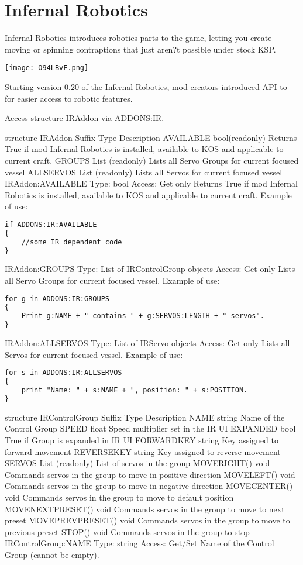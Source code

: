	\section{Infernal Robotics}%
	Infernal Robotics introduces robotics parts to the game, letting you create moving or spinning contraptions that just aren?t possible under stock KSP.
	
\begin{center}
\texttt{[image: O94LBvF.png]}
\end{center}

Starting version 0.20 of the Infernal Robotics, mod creators introduced API to for easier access to robotic features.

Access structure IRAddon via ADDONS:IR.

structure IRAddon
Suffix	Type	Description
AVAILABLE	bool(readonly)	Returns True if mod Infernal Robotics is installed, available to KOS and applicable to current craft.
GROUPS	List (readonly)	Lists all Servo Groups for current focused vessel
ALLSERVOS	List (readonly)	Lists all Servos for current focused vessel
IRAddon:AVAILABLE
Type:	bool
Access:	Get only
Returns True if mod Infernal Robotics is installed, available to KOS and applicable to current craft. Example of use:

\begin{lstlisting}[frame=single,language=XML]
if ADDONS:IR:AVAILABLE
{
    //some IR dependent code
}
\end{lstlisting}

IRAddon:GROUPS
Type:	List of IRControlGroup objects
Access:	Get only
Lists all Servo Groups for current focused vessel. Example of use:

\begin{lstlisting}[frame=single,language=XML]
for g in ADDONS:IR:GROUPS
{
    Print g:NAME + " contains " + g:SERVOS:LENGTH + " servos".
}
\end{lstlisting}

IRAddon:ALLSERVOS
Type:	List of IRServo objects
Access:	Get only
Lists all Servos for current focused vessel. Example of use:

\begin{lstlisting}[frame=single,language=XML]
for s in ADDONS:IR:ALLSERVOS
{
    print "Name: " + s:NAME + ", position: " + s:POSITION.
}
\end{lstlisting}

structure IRControlGroup
Suffix	Type	Description
NAME	string	Name of the Control Group
SPEED	float	Speed multiplier set in the IR UI
EXPANDED	bool	True if Group is expanded in IR UI
FORWARDKEY	string	Key assigned to forward movement
REVERSEKEY	string	Key assigned to reverse movement
SERVOS	List (readonly)	List of servos in the group
MOVERIGHT()	void	Commands servos in the group to move in positive direction
MOVELEFT()	void	Commands servos in the group to move in negative direction
MOVECENTER()	void	Commands servos in the group to move to default position
MOVENEXTPRESET()	void	Commands servos in the group to move to next preset
MOVEPREVPRESET()	void	Commands servos in the group to move to previous preset
STOP()	void	Commands servos in the group to stop
IRControlGroup:NAME
Type:	string
Access:	Get/Set
Name of the Control Group (cannot be empty).

